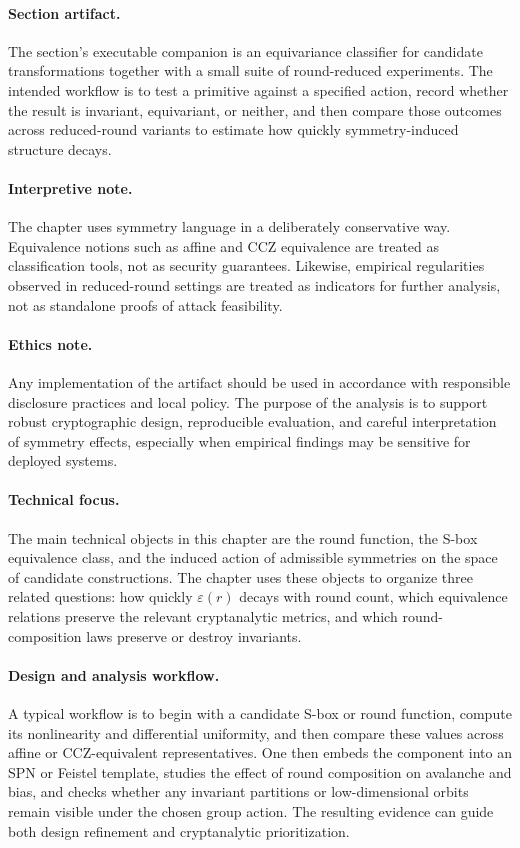 \paragraph{Section artifact.} The section's executable companion is an equivariance classifier for candidate transformations together with a small suite of round-reduced experiments. The intended workflow is to test a primitive against a specified action, record whether the result is invariant, equivariant, or neither, and then compare those outcomes across reduced-round variants to estimate how quickly symmetry-induced structure decays.

\paragraph{Interpretive note.} The chapter uses symmetry language in a deliberately conservative way. Equivalence notions such as affine and CCZ equivalence are treated as classification tools, not as security guarantees. Likewise, empirical regularities observed in reduced-round settings are treated as indicators for further analysis, not as standalone proofs of attack feasibility.

\paragraph{Ethics note.} Any implementation of the artifact should be used in accordance with responsible disclosure practices and local policy. The purpose of the analysis is to support robust cryptographic design, reproducible evaluation, and careful interpretation of symmetry effects, especially when empirical findings may be sensitive for deployed systems.

\paragraph{Technical focus.} The main technical objects in this chapter are the round function, the S-box equivalence class, and the induced action of admissible symmetries on the space of candidate constructions. The chapter uses these objects to organize three related questions: how quickly \(\varepsilon(r)\) decays with round count, which equivalence relations preserve the relevant cryptanalytic metrics, and which round-composition laws preserve or destroy invariants.

\paragraph{Design and analysis workflow.} A typical workflow is to begin with a candidate S-box or round function, compute its nonlinearity and differential uniformity, and then compare these values across affine or CCZ-equivalent representatives. One then embeds the component into an SPN or Feistel template, studies the effect of round composition on avalanche and bias, and checks whether any invariant partitions or low-dimensional orbits remain visible under the chosen group action. The resulting evidence can guide both design refinement and cryptanalytic prioritization.

